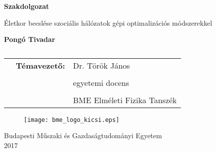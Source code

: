 \documentclass[12pt]{article}
\title{}
\date{}
\begin{document}

\begin{titlepage}
	\centering
	{\Huge\bfseries Szakdolgozat\par}
	\vspace{1cm}
	\vspace{1cm}
	{\LARGE Életkor becslése szociális hálózatok gépi optimalizációs módszerekkel\par}
	\vspace{3cm}
	{\huge\bfseries Pongó Tivadar\\\par}
	\vspace{3cm}
	\begin{table}[H]
		\centering
		\begin{tabular}{ccl}
			&	\LARGE\textbf{Témavezető:} &\Large Dr. Török János \\ %
			& &\\
			& &\Large egyetemi docens \\
			& &\\
			& &\Large BME Elméleti Fizika Tanszék \\
			
		\end{tabular}
		\caption*{}
		\label{t1}
	\end{table}
	\vfill
	\begin{figure}[H]
		\centering
		\texttt{[image: bme\_logo\_kicsi.eps]}
	\end{figure} 
	{\large Budapesti Műszaki és Gazdaságtudományi Egyetem\\ 2017 \par}
\end{titlepage}
\onehalfspacing
\iffalse
\end{document}
